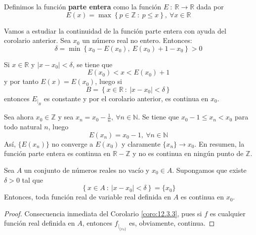 \begin{ejemplo}
    Definimos la función \textbf{parte entera} como la función $E ~:~ \mathbb{R} \longrightarrow \mathbb{R}$ dada por
    \begin{equation*}
        E(x) = \max \left\{ p \in \mathbb{Z} ~:~ p \leq x \right\}, ~ \forall x \in \mathbb{R}
    \end{equation*}
    
    Vamos a estudiar la continuidad de la función parte entera con ayuda del corolario anterior.
    Sea $x_0$ un número real no entero. Entonces:
    \begin{equation*}
        \delta = \min \left\{x_0 - E(x_0), ~ E(x_0)+1-x_0\right\} > 0
    \end{equation*}
    
    Si $x \in \mathbb{R}$ y $\left|x-x_0\right| < \delta$, se tiene que
    \begin{equation*}
        E(x_0) < x < E(x_0)+1
    \end{equation*}
    y por tanto $E(x)=E(x_0)$, luego si
    \begin{equation*}
        B= \left\{x \in \mathbb{R} ~:~ \left|x-x_0\right| < \delta\right\}
    \end{equation*}
    entonces $E_{|_B}$ es constante y por el corolario anterior, es continua en $x_0$.

    Sea ahora $x_0 \in \mathbb{Z}$ y sea $x_n = x_0 - \frac{1}{n}, ~ \forall n \in \mathbb{N}$.
    Se tiene que $x_0-1 \leq x_n < x_0$ para todo natural $n$, luego
    \begin{equation*}
        E(x_n) = x_0-1, ~ \forall n \in \mathbb{N}
    \end{equation*}
    Así, $\{E(x_n)\}$ no converge a $E(x_0)$ y claramente $\{x_n\} \longrightarrow x_0$.
    \newline
    \newline
    En resumen, la función parte entera es continua en $\mathbb{R} - \mathbb{Z}$ y no es continua en
    ningún punto de $\mathbb{Z}$.
\end{ejemplo}

\begin{coro}\label{coro:12.3.4}
    Sea $A$ un conjunto de números reales no vacío y $x_0 \in A$. Supongamos que existe $\delta > 0$
    tal que
    \begin{equation*}
        \left\{x \in A ~:~ \left|x-x_0\right| < \delta \right\} = \{x_0\}
    \end{equation*}
    Entonces, toda función real de variable real definida en $A$ es continua en $x_0$.
\end{coro}
\begin{proof}
    Consecuencia inmediata del Corolario \ref{coro:12.3.3}, pues si $f$ es cualquier función real definida en $A$, entonces $f_{|_{\{x_0\}}}$ es, obviamente, continua.
\end{proof}


